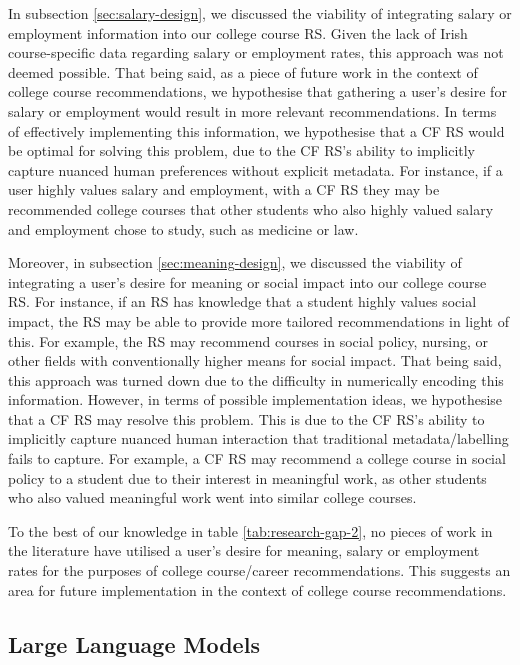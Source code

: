 In subsection \ref{sec:salary-design}, we discussed the viability of integrating salary or employment information into our college course RS.
Given the lack of Irish course-specific data regarding salary or employment rates, this approach was not deemed possible.
That being said, as a piece of future work in the context of college course recommendations, we hypothesise that gathering a user's 
desire for salary or employment would result in more relevant recommendations.
In terms of effectively implementing this information, we hypothesise that a CF RS would be optimal for solving this problem,
due to the CF RS's ability to implicitly capture nuanced human preferences without explicit metadata.
For instance, if a user highly values salary and employment, with a CF RS they may be recommended college courses 
that other students who also highly valued salary and employment chose to study, such as medicine or law.

Moreover, in subsection \ref{sec:meaning-design}, we discussed the viability of integrating a user's desire for meaning or social impact 
into our college course RS.
For instance, if an RS has knowledge that a student highly values social impact, the RS may be able to provide more tailored recommendations in light of this.
For example, the RS may recommend courses in social policy, nursing, or other fields with conventionally higher means for social impact.
That being said, this approach was turned down due to the difficulty in numerically encoding this information.
However, in terms of possible implementation ideas, we hypothesise that a CF RS may 
resolve this problem.
This is due to the CF RS's ability to implicitly capture nuanced human interaction that traditional metadata/labelling fails to capture.
For example, a CF RS may recommend a college course in social policy to a student due to their interest in meaningful work,
as other students who also valued meaningful work went into similar college courses.

To the best of our knowledge in table \ref{tab:research-gap-2}, no pieces of work in the literature have utilised a user's 
desire for meaning, salary or employment rates for the purposes of college course/career recommendations.
This suggests an area for future implementation in the context of college course recommendations.

\subsection{Large Language Models}

